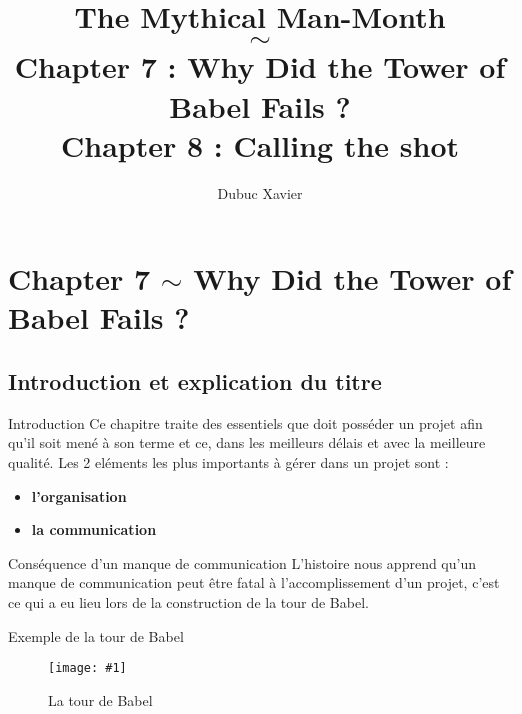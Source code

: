 \documentclass{beamer}
\title[The Mythical Man-Month $\sim$ Chapters 7 \& 8]{The Mythical Man-Month \\ $\sim$ \\ Chapter 7 : Why Did the Tower of Babel 
Fails ? \\ Chapter 8 : Calling the shot}
\author{Dubuc Xavier}
\institute{\imageR{UMONS.jpg}{100}}
\newcommand{\imageR}[2]{\texttt{[image: \#1]}}
\begin{document}


\begin{frame}
\titlepage
\end{frame}


\section{Chapter 7 $\sim$ Why Did the Tower of Babel Fails ?}

\subsection*{Introduction et explication du titre}

\begin{frame}{Introduction}
Ce chapitre traite des essentiels que doit posséder un projet afin qu’il soit mené à son terme et ce, dans les meilleurs délais 
et avec la meilleure qualité. Les 2 eléments les plus importants à gérer dans un projet sont :
\pause
\begin{itemize}
\item \textbf{l'organisation}
\pause \item \textbf{la communication}
\end{itemize}
\end{frame}

\begin{frame}{Conséquence d'un manque de communication}
L'histoire nous apprend qu'un manque de communication peut être fatal à l'accomplissement d'un projet, c'est ce qui a eu lieu lors
de la construction de la tour de Babel.
\end{frame}

\begin{frame}{Exemple de la tour de Babel}
\begin{figure}
	\begin{center}
	\imageR{babel.jpg}{200}
	\caption{La tour de Babel}
	\end{center}	
\end{figure}
\end{frame}
\end{document}
